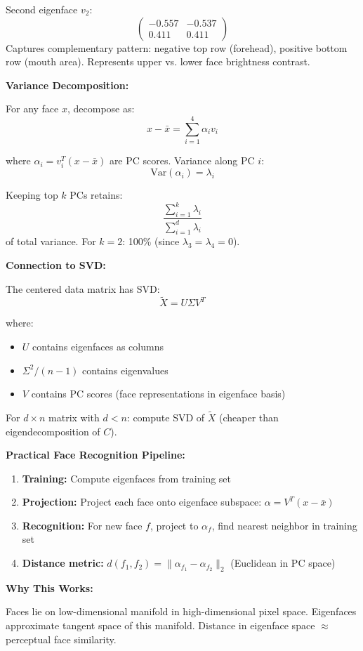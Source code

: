 \documentclass[12pt]{article}
\begin{document}
\begin{explanation}
Second eigenface $v_2$:
\[
\begin{pmatrix}
-0.557 & -0.537 \\
0.411 & 0.411
\end{pmatrix}
\]
Captures complementary pattern: negative top row (forehead), positive bottom row (mouth area). Represents upper vs. lower face brightness contrast.

\textbf{Variance Decomposition:}

For any face $x$, decompose as:
\[
x - \bar{x} = \sum_{i=1}^4 \alpha_i v_i
\]

where $\alpha_i = v_i^T(x - \bar{x})$ are PC scores. Variance along PC $i$:
\[
\text{Var}(\alpha_i) = \lambda_i
\]

Keeping top $k$ PCs retains:
\[
\frac{\sum_{i=1}^k \lambda_i}{\sum_{i=1}^d \lambda_i}
\]
of total variance. For $k=2$: 100\% (since $\lambda_3 = \lambda_4 = 0$).

\textbf{Connection to SVD:}

The centered data matrix has SVD:
\[
\tilde{X} = U\Sigma V^T
\]

where:
\begin{itemize}
    \item $U$ contains eigenfaces as columns
    \item $\Sigma^2/(n-1)$ contains eigenvalues
    \item $V$ contains PC scores (face representations in eigenface basis)
\end{itemize}

For $d \times n$ matrix with $d < n$: compute SVD of $\tilde{X}$ (cheaper than eigendecomposition of $C$).

\textbf{Practical Face Recognition Pipeline:}

\begin{enumerate}
    \item \textbf{Training:} Compute eigenfaces from training set
    \item \textbf{Projection:} Project each face onto eigenface subspace: $\alpha = V^T(x - \bar{x})$
    \item \textbf{Recognition:} For new face $f$, project to $\alpha_f$, find nearest neighbor in training set
    \item \textbf{Distance metric:} $d(f_1, f_2) = \|\alpha_{f_1} - \alpha_{f_2}\|_2$ (Euclidean in PC space)
\end{enumerate}

\textbf{Why This Works:}

Faces lie on low-dimensional manifold in high-dimensional pixel space. Eigenfaces approximate tangent space of this manifold. Distance in eigenface space $\approx$ perceptual face similarity.

\end{explanation}
\end{document}
